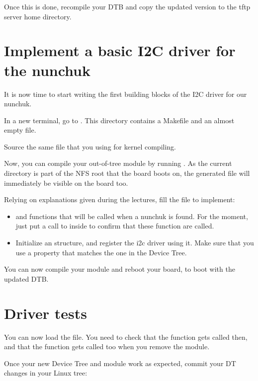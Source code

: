 Once this is done, recompile your DTB and copy the updated version to
the tftp server home directory.

\section{Implement a basic I2C driver for the nunchuk}

It is now time to start writing the first building blocks of the I2C
driver for our nunchuk.

In a new terminal, go to .
This directory contains a Makefile and an almost empty 
file.

Source the same  file that you using for kernel compiling.

Now, you can compile your out-of-tree module by running . As
the current directory is part of the NFS root that the board boots on,
the generated  file will immediately be visible on the board
too.

Relying on explanations given during the lectures, fill the
 file to implement:

\begin{itemize}
\item {} and  functions that will
      be called when a nunchuk is found.
      For the moment, just put a call to  inside
      to confirm that these function are called.
\item Initialize an  structure, and register
      the i2c driver using it. Make sure that you use
      a  property that matches the one in the
      Device Tree.
\end{itemize}

You can now compile your module and reboot your board, to 
boot with the updated DTB.

\section{Driver tests}

You can now load the  file.
You need to check that the  function gets called
then, and that the  function gets called too
when you remove the module.

Once your new Device Tree and module work as expected, commit
your DT changes in your Linux tree:

